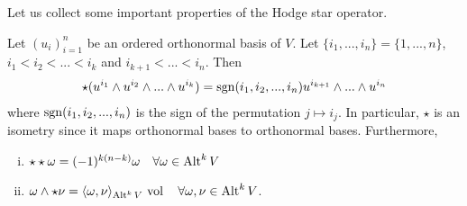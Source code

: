 \documentclass[../main.tex]{subfiles}
\begin{document}
Let us collect some important properties of the Hodge star operator.
\begin{proposition}\label{prop:properties_hodge_star}
    Let $(u_i)_{i=1}^n$ be an ordered orthonormal basis of $V$. Let 
    $\{ i_1, ..., i_n \} = \{ 1, ..., n\}$, $i_1 < i_2 < ... < i_k$ and 
    $i_{k+1} < ... < i_n$. Then
    \begin{align}
        \star (u^{i_1} \wedge u^{i_2} \wedge ... \wedge u^{i_k})
        = \operatorname{sgn}(i_1,i_2,...,i_n) u^{i_{k+1}} \wedge ... \wedge u^{i_{n}}
        \label{eq:hodge_star_orthonormal_basis}
    \end{align}
    where $\operatorname{sgn}(i_1,i_2,...,i_n)$ 
    is the sign of the permutation $j \mapsto i_j$. In particular, 
    $\star$ is an isometry since it maps orthonormal bases to orthonormal 
    bases. Furthermore,
    \begin{enumerate}[(i)]
        \item $\star \star \omega = (-1)^{k(n-k)} \omega \quad \forall \omega 
            \in {\text{Alt}^{k}\,V}$
        \item $\omega \wedge \star \nu = \langle \omega, \nu \rangle
            _{{\text{Alt}^{k}\,V}}  \, \operatorname{vol} \quad \forall \omega, \nu \in {\text{Alt}^{k}\,V}$.     
    \end{enumerate}
\end{proposition}
\end{document}
